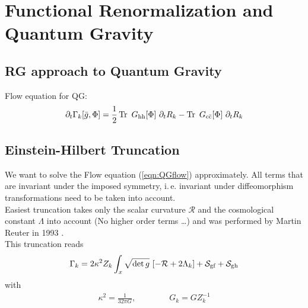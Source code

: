 \chapter{Functional Renormalization and Quantum Gravity}
\section{RG approach to Quantum Gravity}
Flow equation for QG:
\begin{align}
	\partial_t\Gammak[\bar{g}, \Phi] = \frac{1}{2} \operatorname{Tr}\ G_{\text{hh}}[\Phi] \ \partial_tR_k - \operatorname{Tr}\ G_{\text{c}\bar{\text{c}}}[\Phi] \ \partial_tR_k
\end{align}

\section{Einstein-Hilbert Truncation}
We want to solve the Flow equation (\ref{eqn:QGflow}) approximately. All terms that are invariant under the imposed symmetry, i.\,e. invariant under diffeomorphism transformations need to be taken into account. \\

Easiest truncation takes only the scalar curvature $\mathcal{R}$ and the cosmological constant $\Lambda$ into account (No higher order terms \dots) and was performed by Martin Reuter in 1993 \cite{ReuterSaueressig2002}. \\


This truncation reads
\begin{align}
	\Gammak = 2\kappa^2Z_k \int_x \sqrt{\operatorname{det}g} \ [-\mathcal{R} + 2\Lambda_k] + \mathcal{S}_{\text{gf}} + \mathcal{S}_{\text{gh}}
\label{eqn:QGflow}
\end{align}
with 
\begin{align}
	\kappa^2 = \frac{1}{32\pi G}, \qquad\qquad G_k = GZ^{-1}_k
\end{align}

